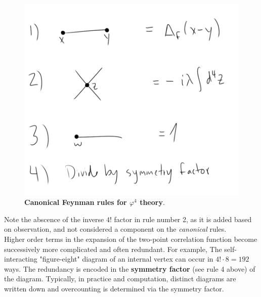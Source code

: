 \begin{figure}[H]
	\centering
	\includegraphics[scale=0.5]{images/phi4rules.png}
	\caption{\textbf{Canonical Feynman rules for $\varphi^4$ theory}.}
\end{figure}

\noindent Note the abscence of the inverse $4!$ factor in rule number 2, as it is added based on observation, and not considered a component on the \textit{canonical} rules. \\

\noindent Higher order terms in the expansion of the two-point correlation function become successively more complicated and often redundant. For example, The self-interacting "figure-eight" diagram of an internal vertex can occur in $4!\cdot8=192$ ways. The redundancy is encoded in the \textbf{symmetry factor} (see rule 4 above) of the diagram. Typically, in practice and computation, distinct diagrams are written down and overcounting is determined via the symmetry factor.